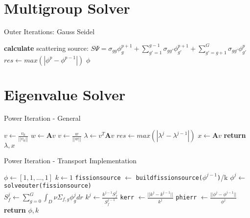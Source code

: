 \section{Multigroup Solver}
\begin{algorithm}
\caption{Outer Iterations: Gauss Seidel}
\begin{algorithmic}
     
            \State \textbf{calculate} scattering source: \State $S\Psi = \sigma_{gg}\phi_g^{p+1} + \sum\limits_{g'=1}^{g-1} \sigma_{gg'} \phi_{g'}^{p+1} + \sum\limits_{g'=g+1}^G \sigma_{gg'}\phi_{g'}^p$
        \EndProcedure
        \EndFor
        \State $res \gets max(|\phi^{p} - \phi^{p-1}|)$  
        \EndWhile
    \Return $\phi$
\end{algorithmic}
\end{algorithm}

\section{Eigenvalue Solver}
\begin{algorithm}
\caption{Power Iteration - General}
\begin{algorithmic}
    \State $v \gets \frac{v_0}{||v_0||}$ 
     
        \State $w \gets \textbf{A}v$
        \State $v \gets \frac{w}{|| w||}$
        \State $\lambda \gets v^T\textbf{A}v$
        \State $res \gets max(|\lambda^j - \lambda^{j-1}|)$
    \EndWhile
    \State $x \gets \textbf{A}v$
    \State \textbf{return} $\lambda, x$
\end{algorithmic}
\end{algorithm}

\begin{algorithm}
\caption{Power Iteration - Transport Implementation}
\begin{algorithmic}
    \State $\phi \gets [1, 1, ..., 1] $ 
    \State $k \gets 1$
     
        \State \texttt{fission\textunderscore source} $\gets$ \texttt{build\textunderscore fission\textunderscore source($\phi^{j-1}$)}/k
        \State $\phi^j \gets$ \texttt{solve\textunderscore outer(fission\textunderscore source)} \\
        \State $S_f^j \gets \sum\limits_{g=0}^{G} \int_D \nu \Sigma_{f, g} \phi_g^jdr$
        \State $k^j \gets \frac{k^{j-1}S_f^j}{S_f^{j-1}}$
        \State \texttt{kerr} $\gets \frac{||k^j - k^{j-1}||}{k^j}$
        \State \texttt{phierr} $\gets \frac{||\phi^j - \phi^{j-1}||}{\phi^j}$
    \EndWhile
    \State \textbf{return} $\phi, k$
\end{algorithmic}
\end{algorithm}

